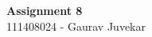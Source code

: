 \documentclass[main.tex]{subfiles}
\begin{document}
\begin{titlepage}

\begin{center}
  \LARGE{\bf{Assignment 8\\}}
  \horrule{0.4pt}
  111408024 - Gaurav Juvekar \\
\end{center}
\horrule{0.4pt}
\end{titlepage}
\end{document}

